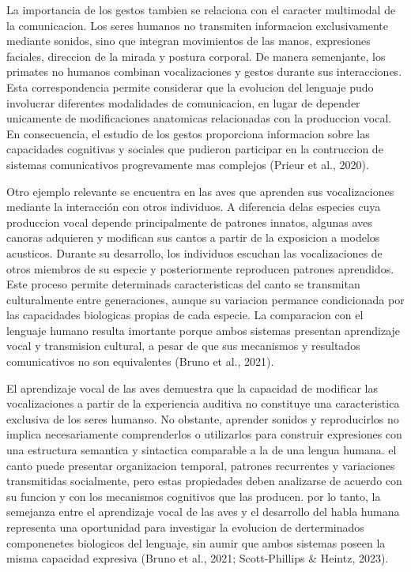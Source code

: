 \documentclass[12pt]{article}
\begin{document}
La importancia de los gestos tambien se relaciona con el caracter multimodal de la comunicacion. Los seres humanos no transmiten informacion exclusivamente mediante sonidos, sino que integran movimientos de las manos, expresiones faciales, direccion de la mirada y postura corporal. De manera semenjante, los primates no humanos combinan vocalizaciones y gestos durante sus interacciones. Esta correspondencia permite considerar que la evolucion del lenguaje pudo involucrar diferentes modalidades de comunicacion, en lugar de depender unicamente de modificaciones anatomicas relacionadas con la produccion vocal. En consecuencia, el estudio de los gestos proporciona informacion sobre las capacidades cognitivas y sociales que pudieron participar en la contruccion de sistemas comunicativos progrevamente mas complejos (Prieur et al., 2020). 

Otro ejemplo relevante se encuentra en las aves que aprenden sus vocalizaciones mediante la interacción con otros individuos.  A diferencia delas especies cuya produccion vocal depende principalmente de patrones innatos, algunas aves canoras adquieren y modifican sus cantos a partir de la exposicion a modelos acusticos. Durante su desarrollo, los individuos escuchan las vocalizaciones de otros miembros de su especie y posteriormente reproducen patrones aprendidos. Este proceso permite determinads caracteristicas del canto se transmitan culturalmente entre generaciones, aunque su variacion permance condicionada por las capacidades biologicas propias de cada especie. La comparacion con el lenguaje humano resulta imortante porque ambos sistemas presentan aprendizaje vocal y transmision cultural, a pesar de que sus mecanismos y resultados comunicativos no son equivalentes (Bruno et al., 2021).

El aprendizaje vocal de las aves demuestra que la capacidad de modificar las vocalizaciones a partir de la experiencia auditiva no constituye una caracteristica exclusiva de los seres humanso. No obstante, aprender sonidos y reproducirlos no implica necesariamente comprenderlos o utilizarlos para construir expresiones con una estructura semantica y sintactica comparable a la de una lengua humana. el canto puede presentar organizacion temporal, patrones recurrentes y variaciones transmitidas socialmente, pero estas propiedades deben analizarse de acuerdo con su funcion y con los mecanismos cognitivos que las producen. por lo tanto, la semejanza entre el aprendizaje vocal de las aves y el desarrollo del habla humana representa una oportunidad para investigar la evolucion de derterminados componenetes biologicos del lenguaje, sin aumir que ambos sistemas poseen la misma capacidad expresiva (Bruno et al., 2021; Scott-Phillips \& Heintz, 2023).
\end{document}
